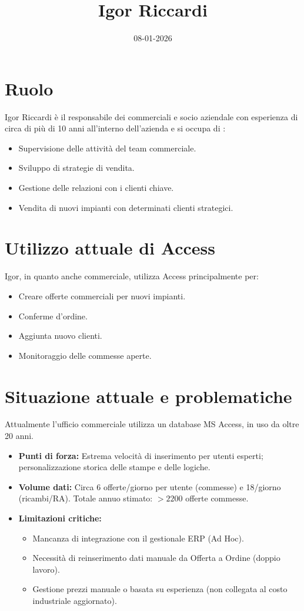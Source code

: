 \documentclass[12pt, a4paper]{article} %
\title{Igor Riccardi}
\date{08-01-2026}
\begin{document}
\maketitle

\section{Ruolo}
Igor Riccardi è il responsabile dei commerciali e socio aziendale con esperienza di circa di più di 10 anni all'interno dell'azienda e si occupa di :
\begin{itemize}
    \item Supervisione delle attività del team commerciale.
    \item Sviluppo di strategie di vendita.
    \item Gestione delle relazioni con i clienti chiave.
    \item Vendita di nuovi impianti con determinati clienti strategici.
\end{itemize}

\section{Utilizzo attuale di Access}
Igor, in quanto anche commerciale, utilizza Access principalmente per:
\begin{itemize}
    \item Creare offerte commerciali per nuovi impianti.
    \item Conferme d'ordine.
    \item Aggiunta nuovo clienti.
    \item Monitoraggio delle commesse aperte.
\end{itemize}


\section{Situazione attuale e problematiche}
Attualmente l'ufficio commerciale utilizza un database MS Access, in uso da
oltre 20 anni.
\begin{itemize}
    \item \textbf{Punti di forza:} Estrema velocità di inserimento per utenti esperti; personalizzazione storica delle stampe e delle logiche.
    \item \textbf{Volume dati:} Circa 6 offerte/giorno per utente (commesse) e 18/giorno (ricambi/RA). Totale annuo stimato: $>2200$ offerte commesse.
    \item \textbf{Limitazioni critiche:}
          \begin{itemize}
              \item Mancanza di integrazione con il gestionale ERP (Ad Hoc).
              \item Necessità di reinserimento dati manuale da Offerta a Ordine (doppio lavoro).
              \item Gestione prezzi manuale o basata su esperienza (non collegata al costo
                    industriale aggiornato).
          \end{itemize}
\end{itemize}
\end{document}
